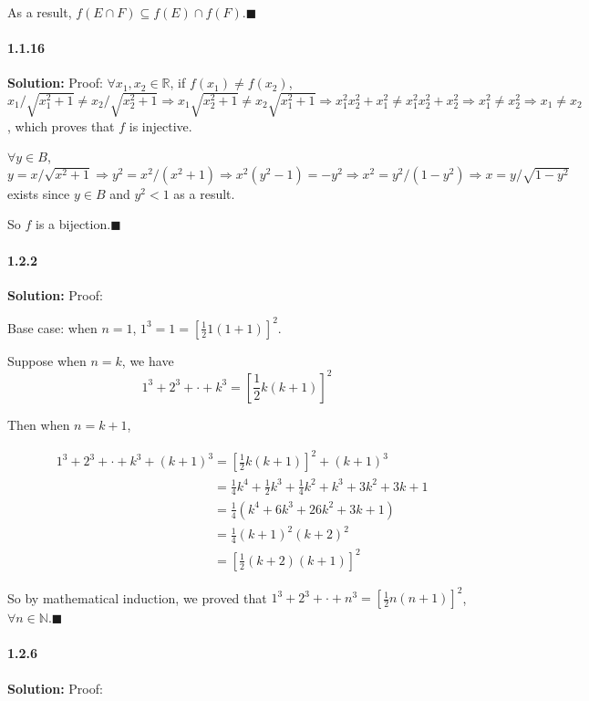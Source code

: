 \documentclass[11pt]{article}
\begin{document}
		As a result, $f(E \cap F) \subseteq f(E) \cap f(F)$.$\blacksquare$
\paragraph{1.1.16}\textbf{Solution:}
	Proof:
	$\forall x_1, x_2 \in \mathbb{R}$,  if $f(x_1) \neq f(x_2)$, $x_1/\sqrt{x^2_1 + 1} \neq x_2/\sqrt{x^2_2 + 1} \Rightarrow x_1\sqrt{x^2_2 + 1} \neq x_2\sqrt{x^2_1 + 1} \Rightarrow x_1^2x_2^2 + x_1^2 \neq x_1^2x_2^2 + x_2^2 \Rightarrow x_1^2 \neq x_2^2 \Rightarrow x_1 \neq x_2$, which proves that $f$ is injective.
	
	$\forall y \in B$, $y = x/\sqrt{x^2 + 1} \Rightarrow y^2 = x^2/(x^2 + 1) \Rightarrow x^2(y^2 - 1) = -y^2 \Rightarrow x^2 = y^2/(1 - y^2) \Rightarrow x = y/\sqrt{1 - y^2}$ exists since $y \in B$ and $y^2 < 1$ as a result.
	
	So $f$ is a bijection.$\blacksquare$

\paragraph{1.2.2}\textbf{Solution:}
	Proof:
	
	Base case: when $n = 1$, $1^3 = 1 = [\frac{1}{2}1(1 + 1)]^2$.
	
	Suppose when $n = k$, we have
	\[1^3 + 2^3 + \cdot + k^3 = [\frac{1}{2}k(k + 1)]^2\]
	
	Then when $n = k + 1$,
	
	\begin{align}
		&1^3 + 2^3 + \cdot + k^3 + (k + 1)^3 = [\frac{1}{2}k(k + 1)]^2 + (k + 1)^3\nonumber\\
		&\phantom{1^3 + 2^3 + \cdot + k^3 + (k + 1)^3} = \frac{1}{4}k^4 + \frac{1}{2}k^3 + \frac{1}{4}k^2 + k^3 + 3 k^2 + 3 k + 1\nonumber\\
		&\phantom{1^3 + 2^3 + \cdot + k^3 + (k + 1)^3} = \frac{1}{4}(k^4 + 6k^3 + 26k^2 + 3k + 1)\nonumber\\
		&\phantom{1^3 + 2^3 + \cdot + k^3 + (k + 1)^3} = \frac{1}{4} (k + 1)^2 (k + 2)^2\nonumber\\
		&\phantom{1^3 + 2^3 + \cdot + k^3 + (k + 1)^3} = [\frac{1}{2}(k + 2)(k + 1)]^2\nonumber
	\end{align} 
	
	So by mathematical induction, we proved that $1^3 + 2^3 + \cdot + n^3 = [\frac{1}{2}n(n + 1)]^2$, $\forall n \in \mathbb{N}$.$\blacksquare$

\paragraph{1.2.6}\textbf{Solution:}
	Proof:
	
\end{document}

